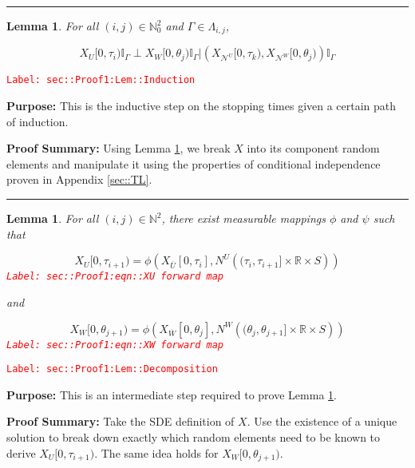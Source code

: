 \documentclass[12pt]{article}
\newcommand{\mb}{\mathbb}
\newcommand{\mc}{\mathcal}
\newcommand{\ov}{\overline}
\newcommand{\tr}{\textcolor{red}}
\newcommand{\labe}[1]{\tr{\texttt{Label: #1}}}
\newcommand{\purpose}{\textbf{Purpose: }}
\newcommand{\pfsum}{\textbf{Proof Summary: }}
\newcommand{\lin}{\rule{\linewidth}{0.4 pt}}
\renewcommand{\U}{U}							%
\newcommand{\UU}{W}								%
\renewcommand{\S}{S}							%
\newcommand{\X}{X}								%
\newcommand{\neigh}{\mc{N}}						%
\newcommand{\vind}[1]{^{#1}}					%
\newcommand{\cind}[1]{_{#1}}					%
\newcommand{\cl}{\ov}							%
\newcommand{\tip}[1]{#1}						%
\newcommand{\poiss}{N}							%
\newcommand{\indx}[1]{_{#1}}					%
\newcommand{\rt}{\tau}							%
\newcommand{\rtt}{\theta}						%
\renewcommand{\it}{k}							%
\newcommand{\apath}{\Gamma}						%
\newcommand{\pathset}[2]{\Lambda_{#1,#2}}		%
\newtheorem{lem}[thms]{Lemma}
\begin{document}
\lin

\begin{lem}
For all \((i,j)\in \mb{N}_0^2\) and \(\apath \in \pathset{i}{j}\),

\[\X\cind{\U}\tip{[0,\rt\indx{i})}\mb{I}_{\apath}\perp \X\cind{\UU}\tip{[0,\rtt\indx{j})}\mb{I}_{\apath}|\left(\X\cind{\neigh\vind{\U}}\tip{[0,\rt\indx{\it})},\X\cind{\neigh\vind{\UU}}\tip{[0,\rtt\indx{j})}\right)\mb{I}_{\apath}\]
\label{sec::Proof1:Lem::Induction}
\end{lem}
\labe{sec::Proof1:Lem::Induction}

\purpose This is the inductive step on the stopping times given a certain path of induction.

\pfsum Using Lemma \ref{sec::Proof1:Lem::Decomposition}, we break \(\X\) into its component random elements and manipulate it using the properties of conditional independence proven in Appendix \ref{sec::TL}.

\lin

\begin{lem}
For all \((i,j)\in \mb{N}^2\), there exist measurable mappings \(\phi\) and \(\psi\) such that 

\begin{equation}
\X\cind{\U}\tip{[0,\rt\indx{i+1})} = \phi\left(\X\cind{\cl{\U}}\tip{[0,\rt\indx{i}]}, \poiss\vind{\U}\left((\rt\indx{i}, \rt\indx{i+1}]\times \mb{R}\times \S\right)\right)
\label{sec::Proof1:eqn::XU forward map}
\end{equation}
\labe{sec::Proof1:eqn::XU forward map}

and

\begin{equation}
\X\cind{\UU}\tip{[0,\rtt\indx{j+1})} = \phi\left(\X\cind{\cl{\UU}}\tip{[0,\rtt\indx{j}]}, \poiss\vind{\UU}\left((\rtt\indx{j}, \rtt\indx{j+1}]\times \mb{R}\times \S\right)\right)
\label{sec::Proof1:eqn::XW forward map}
\end{equation}
\labe{sec::Proof1:eqn::XW forward map}

\label{sec::Proof1:Lem::Decomposition}
\end{lem}
\labe{sec::Proof1:Lem::Decomposition}

\purpose This is an intermediate step required to prove Lemma \ref{sec::Proof1:Lem::Induction}.

\pfsum Take the SDE definition of \(\X\). Use the existence of a unique solution to break down exactly which random elements need to be known to derive \(\X\cind{\U}\tip{[0,\rt\indx{i+1})}\). The same idea holds for \(\X\cind{\UU}\tip{[0,\rtt\indx{j+1})}\).
\end{document}
